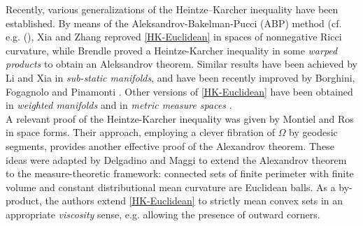 \documentclass[11pt]{amsart}
\theoremstyle{definition}
\theoremstyle{remark}
\numberwithin{equation}{section}
\begin{document}
	Recently, various generalizations of the Heintze–Karcher inequality have been established. By means of the Aleksandrov-Bakelman-Pucci (ABP) method (cf. e.g. (\cite{MR1814364}), Xia and Zhang \cite{MR3702549} reproved \eqref{HK-Euclidean} in spaces of nonnegative Ricci curvature, while Brendle \cite{MR3090261} proved a Heintze-Karcher inequality in some \emph{warped products} to obtain an Aleksandrov theorem. Similar results have been achieved by Li and Xia \cite{MR4031740} in \emph{sub-static manifolds}, and have been recently improved by Borghini, Fogagnolo and Pinamonti \cite{MR4819146,MR4438902}. Other versions of \eqref{HK-Euclidean} have been obtained in \emph{weighted manifolds}  \cite{MR2161354} and in \emph{metric measure spaces} \cite{MR4127847}.\\
	
	A relevant proof of the Heintze-Karcher inequality was given by Montiel and Ros \cite{MR1173047} in space forms. Their approach, employing a clever fibration of $\Omega$ by geodesic segments, %
	provides another effective proof of the Alexandrov theorem. These ideas were adapted by Delgadino and Maggi \cite{MR3921314} to extend the Alexandrov theorem to the measure-theoretic framework: connected sets of finite perimeter with finite volume and constant distributional mean curvature are Euclidean balls. As a by-product, the authors extend \eqref{HK-Euclidean} to strictly mean convex sets in an appropriate \emph{viscosity} sense, e.g. allowing the presence of outward corners.\\
	
	
\end{document}
